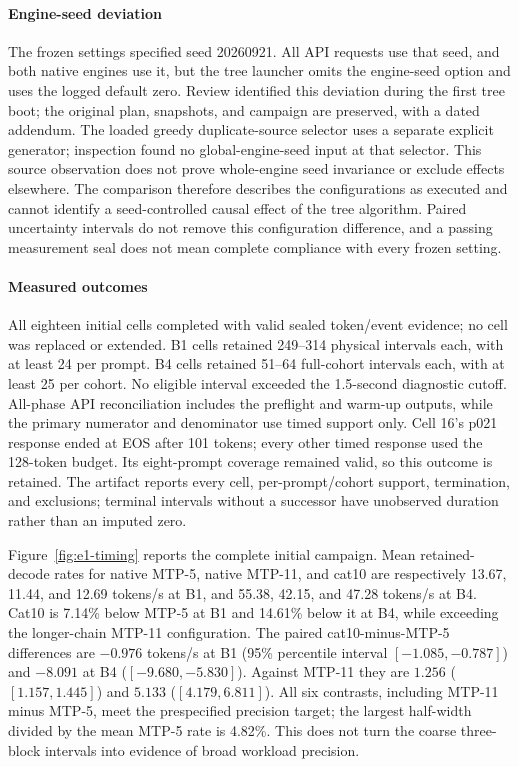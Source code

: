 \documentclass[conference]{IEEEtran}
\begin{document}
\paragraph{Engine-seed deviation}
The frozen settings specified seed 20260921. All API requests use that seed, and both native engines use it, but the tree launcher omits the engine-seed option and uses the logged default zero. Review identified this deviation during the first tree boot; the original plan, snapshots, and campaign are preserved, with a dated addendum. The loaded greedy duplicate-source selector uses a separate explicit generator; inspection found no global-engine-seed input at that selector. This source observation does not prove whole-engine seed invariance or exclude effects elsewhere. The comparison therefore describes the configurations as executed and cannot identify a seed-controlled causal effect of the tree algorithm. Paired uncertainty intervals do not remove this configuration difference, and a passing measurement seal does not mean complete compliance with every frozen setting.

\paragraph{Measured outcomes}
All eighteen initial cells completed with valid sealed token/event evidence; no cell was replaced or extended. B1 cells retained 249--314 physical intervals each, with at least 24 per prompt. B4 cells retained 51--64 full-cohort intervals each, with at least 25 per cohort. No eligible interval exceeded the 1.5-second diagnostic cutoff. All-phase API reconciliation includes the preflight and warm-up outputs, while the primary numerator and denominator use timed support only. Cell 16's p021 response ended at EOS after 101 tokens; every other timed response used the 128-token budget. Its eight-prompt coverage remained valid, so this outcome is retained. The artifact reports every cell, per-prompt/cohort support, termination, and exclusions; terminal intervals without a successor have unobserved duration rather than an imputed zero.

Figure~\ref{fig:e1-timing} reports the complete initial campaign. Mean retained-decode rates for native MTP-5, native MTP-11, and cat10 are respectively 13.67, 11.44, and 12.69 tokens/s at B1, and 55.38, 42.15, and 47.28 tokens/s at B4. Cat10 is 7.14\% below MTP-5 at B1 and 14.61\% below it at B4, while exceeding the longer-chain MTP-11 configuration. The paired cat10-minus-MTP-5 differences are $-0.976$ tokens/s at B1 (95\% percentile interval $[-1.085,-0.787]$) and $-8.091$ at B4 ($[-9.680,-5.830]$). Against MTP-11 they are $1.256$ ($[1.157,1.445]$) and $5.133$ ($[4.179,6.811]$). All six contrasts, including MTP-11 minus MTP-5, meet the prespecified precision target; the largest half-width divided by the mean MTP-5 rate is 4.82\%. This does not turn the coarse three-block intervals into evidence of broad workload precision.
\end{document}
